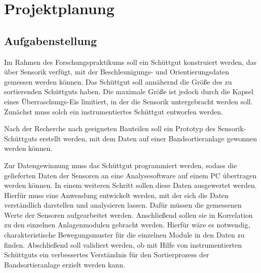 \section{Projektplanung}

\subsection{Aufgabenstellung}
 
Im Rahmen des Forschungspraktikums soll ein Schüttgut konstruiert werden, das über Sensorik verfügt, mit der Beschleunigungs- und Orientierungsdaten gemessen werden können. Das Schüttgut soll annähernd die Größe des zu sortierenden Schüttguts haben. Die maximale Größe ist jedoch durch die Kapsel eines Überraschungs-Eis limitiert, in der die Sensorik untergebracht werden soll. Zunächst muss solch ein instrumentiertes Schüttgut entworfen werden.
 
Nach der Recherche nach geeigneten Bauteilen soll ein Prototyp des Sensorik-Schüttguts erstellt werden, mit dem Daten auf einer Bandsortieranlage gewonnen werden können.

Zur Datengewinnung muss das Schüttgut programmiert werden, sodass die gelieferten Daten der Sensoren an eine Analysesoftware auf einem PC übertragen werden können. In einem weiteren Schritt sollen diese Daten ausgewertet werden. Hierfür muss eine Anwendung entwickelt werden, mit der sich die Daten verständlich darstellen und analysieren lassen. Dafür müssen die gemessenen Werte der Sensoren aufgearbeitet werden. Anschließend sollen sie in Korrelation zu den einzelnen Anlagenmodulen gebracht werden. Hierfür wäre es notwendig, charakteristische Bewegungsmuster für die einzelnen Module in den Daten zu finden. 
Abschließend soll validiert werden, ob mit Hilfe von instrumentierten Schüttguts ein verbessertes Verständnis für den Sortierprozess der Bandsortieranlage erzielt werden kann.

